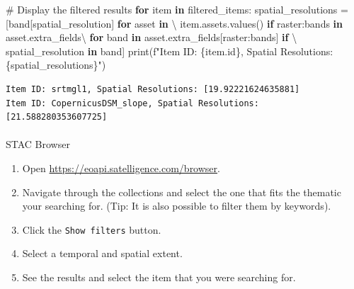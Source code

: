 \documentclass[
  oneside,
  open=any]{scrbook}
\makeatletter
\let\oldparagraph\paragraph
\renewcommand{\paragraph}{
    \@ifstar
      \xxxParagraphStar
      \xxxParagraphNoStar
  }
\newcommand{\xxxParagraphStar}[1]{\oldparagraph*{#1}\mbox{}}
\newcommand{\xxxParagraphNoStar}[1]{\oldparagraph{#1}\mbox{}}
\newenvironment{Shaded}{\begin{snugshade}}{\end{snugshade}}
\newcommand{\BuiltInTok}[1]{\textcolor[rgb]{0.00,0.23,0.31}{#1}}
\newcommand{\CommentTok}[1]{\textcolor[rgb]{0.37,0.37,0.37}{#1}}
\newcommand{\ControlFlowTok}[1]{\textcolor[rgb]{0.00,0.23,0.31}{\textbf{#1}}}
\newcommand{\KeywordTok}[1]{\textcolor[rgb]{0.00,0.23,0.31}{\textbf{#1}}}
\newcommand{\NormalTok}[1]{\textcolor[rgb]{0.00,0.23,0.31}{#1}}
\newcommand{\OperatorTok}[1]{\textcolor[rgb]{0.37,0.37,0.37}{#1}}
\newcommand{\SpecialCharTok}[1]{\textcolor[rgb]{0.37,0.37,0.37}{#1}}
\newcommand{\SpecialStringTok}[1]{\textcolor[rgb]{0.13,0.47,0.30}{#1}}
\newcommand{\StringTok}[1]{\textcolor[rgb]{0.13,0.47,0.30}{#1}}
\providecommand{\tightlist}{%
  \setlength{\itemsep}{0pt}\setlength{\parskip}{0pt}}\usepackage{longtable,booktabs,array}
\makeatother
\begin{document}
\begin{Shaded}
\begin{Highlighting}[]
\CommentTok{\# Display the filtered results}
\ControlFlowTok{for}\NormalTok{ item }\KeywordTok{in}\NormalTok{ filtered\_items:}
\NormalTok{    spatial\_resolutions }\OperatorTok{=}\NormalTok{ [band[}\StringTok{\textquotesingle{}spatial\_resolution\textquotesingle{}}\NormalTok{] }\ControlFlowTok{for}\NormalTok{ asset }\KeywordTok{in} \OperatorTok{\textbackslash{}}
\NormalTok{        item.assets.values() }\ControlFlowTok{if} \StringTok{\textquotesingle{}raster:bands\textquotesingle{}} \KeywordTok{in}\NormalTok{ asset.extra\_fields}\OperatorTok{\textbackslash{}}
             \ControlFlowTok{for}\NormalTok{ band }\KeywordTok{in}\NormalTok{ asset.extra\_fields[}\StringTok{\textquotesingle{}raster:bands\textquotesingle{}}\NormalTok{] }\ControlFlowTok{if} \OperatorTok{\textbackslash{}}
                \StringTok{\textquotesingle{}spatial\_resolution\textquotesingle{}} \KeywordTok{in}\NormalTok{ band]}
    \BuiltInTok{print}\NormalTok{(}\SpecialStringTok{f"Item ID: }\SpecialCharTok{\{}\NormalTok{item}\SpecialCharTok{.}\BuiltInTok{id}\SpecialCharTok{\}}\SpecialStringTok{, Spatial Resolutions: }\SpecialCharTok{\{}\NormalTok{spatial\_resolutions}\SpecialCharTok{\}}\SpecialStringTok{"}\NormalTok{)}
\end{Highlighting}
\end{Shaded}

\begin{verbatim}
Item ID: srtmgl1, Spatial Resolutions: [19.92221624635881]
Item ID: CopernicusDSM_slope, Spatial Resolutions: [21.588280353607725]
\end{verbatim}

\paragraph{STAC Browser}\label{stac-browser}

\begin{enumerate}
\def\labelenumi{\arabic{enumi}.}
\tightlist
\item
  Open \url{https://eoapi.satelligence.com/browser}.
\item
  Navigate through the collections and select the one that fits the
  thematic your searching for. (Tip: It is also possible to filter them
  by keywords).
\item
  Click the \texttt{Show\ filters} button.
\item
  Select a temporal and spatial extent.
\item
  See the results and select the item that you were searching for.
\end{enumerate}
\end{document}
